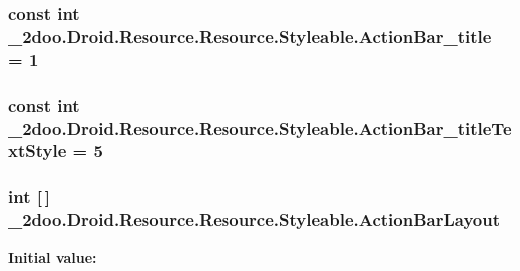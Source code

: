 \hypertarget{class__2doo_1_1_droid_1_1_resource_1_1_styleable_23368662d6a53b9370919abdf91d342f}{
\subsubsection[{ActionBar\_\-title}]{\setlength{\rightskip}{0pt plus 5cm}const int \_\-2doo.Droid.Resource.Resource.Styleable.ActionBar\_\-title = 1}}
\label{class__2doo_1_1_droid_1_1_resource_1_1_styleable_23368662d6a53b9370919abdf91d342f}


\hypertarget{class__2doo_1_1_droid_1_1_resource_1_1_styleable_c64a54b1348e51341a69ee2cffbf690f}{
\subsubsection[{ActionBar\_\-titleTextStyle}]{\setlength{\rightskip}{0pt plus 5cm}const int \_\-2doo.Droid.Resource.Resource.Styleable.ActionBar\_\-titleTextStyle = 5}}
\label{class__2doo_1_1_droid_1_1_resource_1_1_styleable_c64a54b1348e51341a69ee2cffbf690f}


\hypertarget{class__2doo_1_1_droid_1_1_resource_1_1_styleable_bedc6361b06eb7a67bfe08ba2311517c}{
\subsubsection[{ActionBarLayout}]{\setlength{\rightskip}{0pt plus 5cm}int \mbox{[}$\,$\mbox{]} \_\-2doo.Droid.Resource.Resource.Styleable.ActionBarLayout}}
\label{class__2doo_1_1_droid_1_1_resource_1_1_styleable_bedc6361b06eb7a67bfe08ba2311517c}


\textbf{Initial value:}

